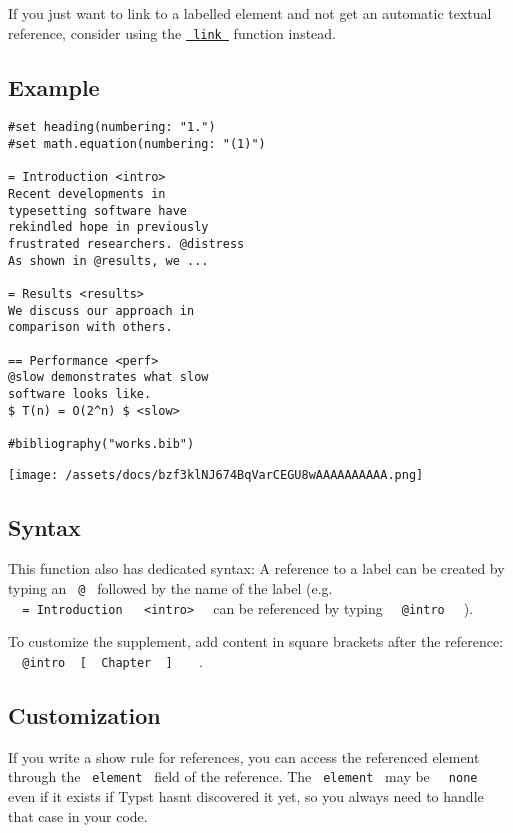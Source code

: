If you just want to link to a labelled element and not get an automatic
textual reference, consider using the
\href{/docs/reference/model/link/}{\texttt{\ link\ }} function instead.

\subsection{Example}\label{example}

\begin{verbatim}
#set heading(numbering: "1.")
#set math.equation(numbering: "(1)")

= Introduction <intro>
Recent developments in
typesetting software have
rekindled hope in previously
frustrated researchers. @distress
As shown in @results, we ...

= Results <results>
We discuss our approach in
comparison with others.

== Performance <perf>
@slow demonstrates what slow
software looks like.
$ T(n) = O(2^n) $ <slow>

#bibliography("works.bib")
\end{verbatim}

\texttt{[image: /assets/docs/bzf3klNJ674BqVarCEGU8wAAAAAAAAAA.png]}

\subsection{Syntax}\label{syntax}

This function also has dedicated syntax: A reference to a label can be
created by typing an \texttt{\ @\ } followed by the name of the label
(e.g.
\texttt{\ }{\texttt{\ =\ Introduction\ }}\texttt{\ }{\texttt{\ \textless{}intro\textgreater{}\ }}\texttt{\ }
can be referenced by typing \texttt{\ }{\texttt{\ @intro\ }}\texttt{\ }
).

To customize the supplement, add content in square brackets after the
reference:
\texttt{\ }{\texttt{\ @intro\ }{\texttt{\ {[}\ }}\texttt{\ Chapter\ }{\texttt{\ {]}\ }}\texttt{\ }}\texttt{\ }
.

\subsection{Customization}\label{customization}

If you write a show rule for references, you can access the referenced
element through the \texttt{\ element\ } field of the reference. The
\texttt{\ element\ } may be \texttt{\ }{\texttt{\ none\ }}\texttt{\ }
even if it exists if Typst hasn\textquotesingle t discovered it yet, so
you always need to handle that case in your code.

